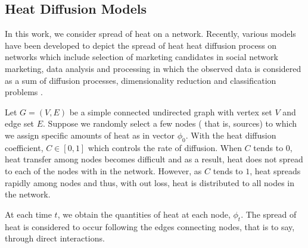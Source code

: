 \documentclass[10pt,a4paper]{article}
\begin{document}
    \subsection{Heat Diffusion Models}
    In this work, we consider spread of heat on a network. Recently, various models have been developed to depict the spread of heat heat diffusion process on networks which include selection of marketing candidates in social network marketing, data analysis and processing in which the observed data is considered as a sum of diffusion processes, dimensionality reduction and classification problems   \citep{ma2008mining,thanou2017learning,belkin2003laplacian}.
    
    Let $G=(V,E)$ be a simple connected undirected graph with vertex set $V$ and edge set $E$. Suppose we randomly select a few nodes ( that is, sources) to which we assign specific amounts of heat as in vector $\phi_0$. With the heat diffusion coefficient, $C \in [0,1]$ which controls the rate of diffusion. When $C$ tends to $0$, heat transfer among nodes becomes difficult and as a result, heat does not spread to each of the nodes with in the network. However, as $C$ tends to $1$, heat spreads rapidly among nodes and thus, with out loss, heat is distributed to all nodes in the network.
    
   At each time $t$, we obtain the quantities of heat at each node, $\phi_t$. The spread of heat is considered to occur following the edges connecting nodes, that is to say, through direct interactions.  
    	
\end{document}
